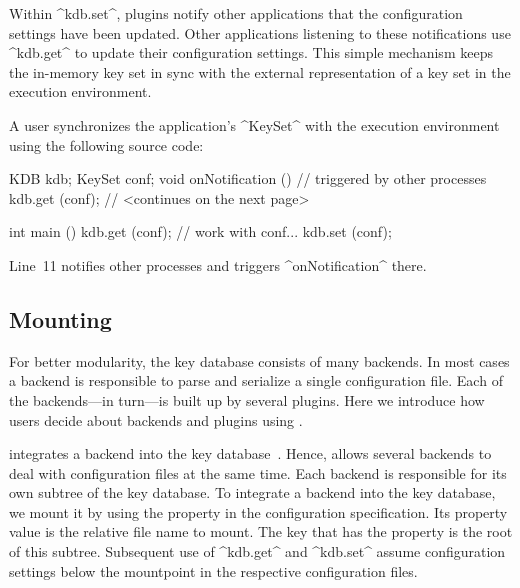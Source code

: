 Within ^kdb.set^, plugins notify other applications that the configuration settings have been updated.
Other applications listening to these notifications use ^kdb.get^ to update their configuration settings.
This simple mechanism keeps the in-memory key set in sync with the external representation of a key set in the execution environment.

\begin{example}
A user synchronizes the application's ^KeySet^ with the execution environment using the following source code:
\par
\begin{code}[language=Cpp]
KDB kdb;
KeySet conf;
void onNotification () // triggered by other processes
{
	kdb.get (conf);
} // <continues on the next page>
\end{code}

\begin{code}[language=Cpp,firstnumber=7]
int main ()
{
	kdb.get (conf);
	// work with conf...
	kdb.set (conf);
}
\end{code}

Line~11 notifies other processes and triggers ^onNotification^ there.
\end{example}

\subsection{Mounting}

For better modularity, the key database consists of many backends.
In most cases a backend is responsible to parse and serialize a single configuration file.
Each of the backends---in turn---is built up by several plugins.
Here we introduce how users decide about backends and plugins using .

 integrates a backend into the key database~\cite{raab2008thesis}.
Hence, \elektra{} allows several backends to deal with configuration files at the same time.
Each backend is responsible for its own subtree of the key database.
To integrate a backend into the key database, we mount it by using the property  in the configuration specification.
Its property value is the relative file name to mount.
The key that has the property  is the root of this subtree.
Subsequent use of ^kdb.get^ and ^kdb.set^ assume configuration settings below the mountpoint in the respective configuration files.

